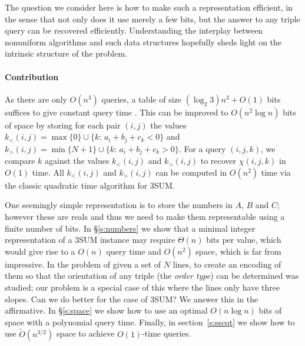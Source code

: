 The question we consider here is how to make such a representation efficient,
in the sense that not only does it use merely a few bits, but the answer to any
triple query can be recovered efficiently. Understanding the interplay between
nonuniform algorithms and such data structures hopefully sheds light on the
intrinsic structure of the problem.

\paragraph{Contribution}

As there are only $O(n^3)$ queries, a table
of size $(\log_2 3) n^3 + O(1)$ bits suffices to give constant query time
\cite{DPT10}. This can be improved to $O(n^2\log n)$ bits of space by
storing for each pair $(i,j)$ the values
\(k_<(i,j) = \max \{ 0\}\cup \{k \colon\, a_i + b_j + c_k < 0\}\) and
\(k_>(i,j) = \min \{ N+1\}\cup \{k \colon\, a_i + b_j + c_k > 0\}\).
For a query \((i,j,k)\), we compare \(k\) against the values \(k_<(i,j)\) and \(k_>(i,j)\)
to recover \(\chi(i,j,k)\) in \(O(1)\) time. All \(k_<(i,j)\) and \(k_>(i,j)\)
can be computed in \(O(n^2)\) time via the classic quadratic time algorithm for
3SUM.

One seemingly simple representation is to store the numbers in $A$, $B$ and
$C$; however these are reals and thus we need to make them representable using
a finite number of bits.
In \S\ref{s:numbers} we show that a minimal integer representation of a
3SUM instance may require $\Theta(n)$ bits per value, which would give
rise to a $O(n)$ query time and $O(n^2)$ space, which is far from
impressive.
In \cite{CCILO18} the problem of given a set of $N$ lines, to create an
encoding of them so that the orientation of any triple (the \emph{order type})
can be determined was studied; our problem is a special case of this where the
lines only have three slopes.
Can we do better for the case of 3SUM? We answer this in the affirmative.
In \S\ref{s:space} we show how to use an optimal $O(n \log n)$ bits of
space with a polynomial query time. Finally, in section~\ref{s:sscqt} we show
how to use $\tilde{O}(n^{3/2})$ space to achieve $O(1)$-time queries.
